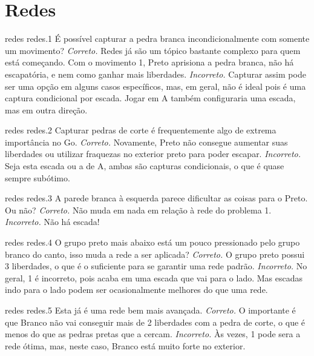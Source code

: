 \chapter{Redes}

\emptypage

\problemAnswerDiagram
  {redes}
  {redes.1}
  {É possível capturar a pedra branca incondicionalmente com somente um movimento?}
  {\emph{Correto.} Redes já são um tópico bastante complexo para quem está começando. Com o movimento 1, Preto aprisiona a pedra branca, não há escapatória, e nem como ganhar mais liberdades.}
  {\emph{Incorreto.} Capturar assim pode ser uma opção em alguns casos específicos, mas, em geral, não é ideal pois é uma captura condicional por escada. Jogar em A também configuraria uma escada, mas em outra direção.}

\problemAnswerDiagram
  {redes}
  {redes.2}
  {Capturar pedras de corte é frequentemente algo de extrema importância no Go.}
  {\emph{Correto.} Novamente, Preto não consegue aumentar suas liberdades ou utilizar fraquezas no exterior preto para poder escapar.}
  {\emph{Incorreto.} Seja esta escada ou a de A, ambas são capturas condicionais, o que é quase sempre subótimo.}

\problemAnswerDiagram
  {redes}
  {redes.3}
  {A parede branca à esquerda parece dificultar as coisas para o Preto. Ou não?}
  {\emph{Correto.} Não muda em nada em relação à rede do problema 1.}
  {\emph{Incorreto.} Não há escada!}

\problemAnswerDiagram
  {redes}
  {redes.4}
  {O grupo preto mais abaixo está um pouco pressionado pelo grupo branco do canto, isso muda a rede a ser aplicada?}
  {\emph{Correto.} O grupo preto possui 3 liberdades, o que é o suficiente para se garantir uma rede padrão.}
  {\emph{Incorreto.} No geral, 1 é incorreto, pois acaba em uma escada que vai para o lado. Mas escadas indo para o lado podem ser ocasionalmente melhores do que uma rede.}

\problemAnswerDiagram
  {redes}
  {redes.5}
  {Esta já é uma rede bem mais avançada.}
  {\emph{Correto.} O importante é que Branco não vai conseguir mais de 2 liberdades com a pedra de corte, o que é menos do que as pedras pretas que a cercam.}
  {\emph{Incorreto.} Às vezes, 1 pode sera a rede ótima, mas, neste caso, Branco está muito forte no exterior.}